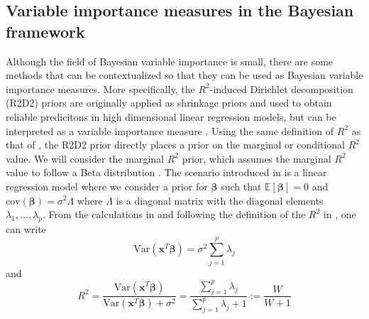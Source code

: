 \subsection{Variable importance measures in the Bayesian framework}
\label{sec:R2D2}
Although the field of Bayesian variable importance is small, there are some methods that can be contextualized so that they can be used as Bayesian variable importance measures.
More specifically, the $R^2$-induced Dirichlet decomposition (R2D2) priors are originally applied as shrinkage priors and used to obtain reliable predicitons in high dimensional linear regression models, but can be interpreted as a variable importance measure \citep{zhang2020bayesian}. Using the same definition of $R^2$ as that of \citet{gelman2017rsquared}, the R2D2 prior directly places a prior on the marginal or conditional $R^2$ value. We will consider the marginal $R^2$ prior, which assumes the marginal $R^2$ value to follow a Beta distribution \citep{zhang2020bayesian}. The scenario introduced in \citet{zhang2020bayesian} is a linear regression model where we consider a prior for $\boldsymbol{\beta}$ such that $\mathbb{E}[\boldsymbol{\beta}]=0$ and $\text{cov}(\boldsymbol{\beta})=\sigma^2\Lambda$ where $\Lambda$ is a diagonal matrix with the diagonal elements $\lambda_1, ..., \lambda_p$. From the calculations in \citet{zhang2020bayesian} and following the definition of the $R^2$ in \citet{gelman2017rsquared}, one can write
\begin{equation}
    \text{Var}(\mathbf{x}^T\boldsymbol{\beta}) = \sigma^2\sum_{j=1}^{p}\lambda_j
\end{equation}
and 
\begin{equation}
    R^2 = \frac{\text{Var}(\mathbf{x}^T\boldsymbol{\beta})}{\text{Var}(\mathbf{x}^T\boldsymbol{\beta}) + \sigma^2} = \frac{\sum_{j=1}^{p}\lambda_j}{\sum_{j=1}^{p}\lambda_j + 1} := \frac{W}{W +1}
\end{equation}
